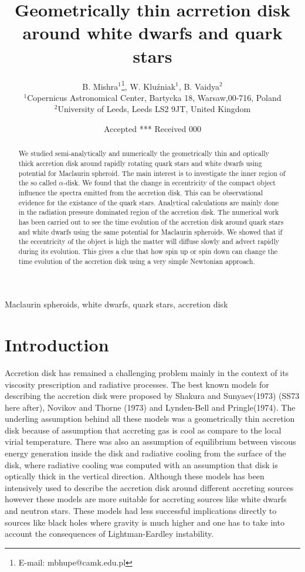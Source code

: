 \documentclass[useAMS,usenatbib]{mn2e}
\title[Geometrically thin acrretion disk around white dwarfs and quark stars]{Geometrically thin acrretion disk around white dwarfs and quark stars}
\author[B. Mishra, W. Klu\'zniak and B. Vaidya]{B. Mishra$^{1}$\thanks{E-mail:
mbhupe@camk.edu.pl}, W. Klu\'zniak$^{1}$, B. Vaidya$^{2}$\\
$^{1}$Copernicus Astronomical Center, Bartycka 18, Warsaw,00-716, Poland\\
$^{2}$University of Leeds, Leeds LS2 9JT, United Kingdom}
\begin{document}
\date{Accepted *** Received 000}
\pagerange{\pageref{firstpage}--\pageref{lastpage}} 
\maketitle
\label{firstpage}
\begin{abstract}
We studied semi-analytically and numerically the geometrically thin and optically thick accretion disk around rapidly rotating quark stars and white dwarfs using potential for Maclaurin spheroid. The main interest is to investigate the inner region of the so called $\alpha$-disk. We found that the change in eccentricity of the compact object influence the spectra emitted from the accretion disk. This can be observational evidence for the existance of the quark stars. Analytical calculations are mainly done in the radiation pressure dominated region of the accretion disk. The numerical work has been carried out to see the time evolution of the accretion disk around quark stars and white dwarfs using the same potential for Maclaurin spheroids. We showed that if the eccentricity of the object is high the matter will diffuse slowly and advect rapidly during its evolution. This gives a clue that how spin up or spin down can change the time evolution of the accretion disk using a very simple Newtonian approach.  
\end{abstract}
\begin{keywords}
Maclaurin spheroids, white dwarfs, quark stars, accretion disk
\end{keywords}
\section{Introduction}
Accretion disk has remained a challenging problem mainly in the context of its viscosity prescription and radiative processes. The best known models for describing the accretion disk were proposed by Shakura and Sunyaev(1973) (SS73 here after), Novikov and Thorne (1973) and Lynden-Bell and Pringle(1974). The underling assumption behind all these models was a geometrically thin accretion disk because of assumption that accreting gas is cool as compare to the local virial temperature. There was also an assumption of equilibrium between viscous energy generation inside the disk and radiative cooling from the surface of the disk, where radiative cooling was computed with an assumption that disk is optically thick in the vertical direction. Although these models has been intensively used to describe the accretion disk around different accreting sources however these models are more suitable for accreting sources like white dwarfs and neutron stars. These models had less successful implications directly to sources like black holes where gravity is much higher and one has to take into account the consequences of Lightman-Eardley instability. 
\end{document}
